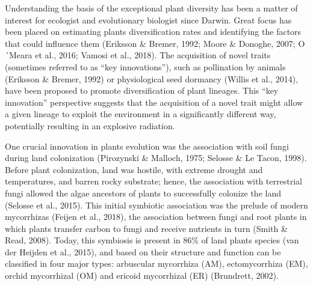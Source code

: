 \documentclass[12pt,]{article}
\begin{document}
Understanding the basis of the exceptional plant diversity has been a
matter of interest for ecologist and evolutionary biologist since
Darwin. Great focus has been placed on estimating plants diversification
rates and identifying the factors that could influence them (Eriksson \&
Bremer, 1992; Moore \& Donoghe, 2007; O´Meara et al., 2016; Vamosi et
al., 2018). The acquisition of novel traits (sometimes referred to as
``key innovations''), such as pollination by animals (Eriksson \&
Bremer, 1992) or physiological seed dormancy (Willis et al., 2014), have
been proposed to promote diversification of plant lineages. This ``key
innovation'' perspective suggests that the acquisition of a novel trait
might allow a given lineage to exploit the environment in a
significantly different way, potentially resulting in an explosive
radiation.

One crucial innovation in plants evolution was the association with soil
fungi during land colonization (Pirozynski \& Malloch, 1975; Selosse \&
Le Tacon, 1998). Before plant colonization, land was hostile, with
extreme drought and temperatures, and barren rocky substrate; hence, the
association with terrestrial fungi allowed the algae ancestors of plants
to successfully colonize the land (Selosse et al., 2015). This initial
symbiotic association was the prelude of modern mycorrhizas (Feijen et
al., 2018), the association between fungi and root plants in which
plants transfer carbon to fungi and receive nutrients in turn (Smith \&
Read, 2008). Today, this symbiosis is present in 86\% of land plants
species (van der Heijden et al., 2015), and based on their structure and
function can be classified in four major types: arbuscular mycorrhiza
(AM), ectomycorrhiza (EM), orchid mycorrhizal (OM) and ericoid
mycorrhizal (ER) (Brundrett, 2002).
\end{document}
